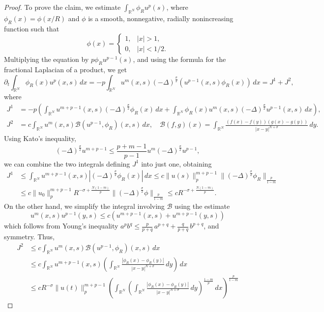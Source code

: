 \documentclass[leqno,12pt]{amsart}
\theoremstyle{definition}
\theoremstyle{remark}
\numberwithin{equation}{section}
\begin{document}
\begin{proof}
To prove the claim, we estimate $\displaystyle\int_{\mathbb{R}^N}\phi_Ru^p(s)$, where $\phi_R(x)=\phi(x/R)$ and $\phi$ is a smooth, nonnegative, radially nonincreasing function such that
\[
    \phi(x)=
    \begin{cases}
        1, & |x|>1,\\
        0, & |x|<1/2.
    \end{cases}
\]
Multiplying the equation by $p\phi_R u^{p-1}(s)$, and using the formula for the fractional Laplacian of a product, we get 
$$    \partial_t\int_{\mathbb{R}^N}\phi_R(x)u^p(x,s)\,dx
    =-p\int_{\mathbb{R}^N} u^m(x,s)(-\Delta)^{\frac\sigma2}(u^{p-1}(x,s)\phi_R(x))\,dx=J^1+J^2,
$$
where
\begin{align*}
    J^1&
    =-p\left(\int_{\mathbb{R}^N} u^{m+p-1}(x,s)(-\Delta)^{\frac\sigma2}\phi_R(x)\,dx+\int_{\mathbb{R}^N}\phi_R(x)u^m(x,s)(-\Delta)^{\frac\sigma2}u^{p-1}(x,s)\,dx\right),
    \\
    J^2&=c\int_{\mathbb{R}^N}u^m(x,s)\mathcal{B}(u^{p-1},\phi_R)(x,s)\,dx,\quad
    \mathcal{B}(f,g)(x)=\int_{\mathbb{R}^N}\frac{(f(x)-f(y))(g(x)-g(y))}{|x-y|^{N+\sigma}}\,dy.
\end{align*}
Using Kato’s inequality,
$$
    (-\Delta)^{\frac\sigma2}u^{m+p-1}\le \frac{p+m-1}{p-1} u^m(-\Delta)^{\frac\sigma2}u^{p-1},
$$
we can combine the two integrals defining $J^1$ into just one, obtaining
\begin{align*}
    J^1&\le\int_{\mathbb{R}^N} u^{m+p-1}(x,s)|(-\Delta)^{\frac\sigma2}\phi_R(x)|\,dx 
    \le c\|u(s)\|_p^{m+p-1}\|(-\Delta)^{\frac\sigma2}\phi_R\|_{\frac p{1-m}}
    \\&
    \le c\|u_0\|_p^{m+p-1}R^{-\sigma+\frac{N(1-m)}{p}}\|(-\Delta)^{\frac\sigma2}\phi\|_{\frac p{1-m}}\le cR^{-\sigma+\frac{N(1-m)}{p}}.
\end{align*}
On the other hand,  we simplify the integral involving $\mathcal{B}$ using the estimate
$$
    u^m(x,s)u^{p-1}(y,s)\le c \left(u^{m+p-1}(x,s)+u^{m+p-1}(y,s)\right)
$$
which follows from Young’s inequality $a^p b^q \le \frac{p}{p+q}\, a^{p+q} + \frac{q}{p+q}\, b^{p+q}$, and symmetry. Thus,
\begin{align*}
J^2&\le c\int_{\mathbb{R}^N}u^m(x,s)\mathcal{B}(u^{p-1},\phi_R)(x,s)\,dx \\ &\le c
\int_{\mathbb{R}^N}u^{m+p-1}(x,s)\left(\int_{\mathbb{R}^N}\frac{|\phi_R(x)-\phi_R(y)|}{|x-y|^{N+\sigma}}\,dy\right)\,dx
\\&
 \leq cR^{-\sigma}\|u(t)\|_p^{m+p-1}\left(\int_{\mathbb{R}^N}\left( \int_{\mathbb{R}^N}\frac{|\phi_R(x)-\phi_R(y)|}{|x-y|^{N+\sigma}}\,dy\right)^{\frac{1-m}{p}}\,dx\right)^{\frac p{1-m}}

\end{align*}
\end{proof}
\end{document}

